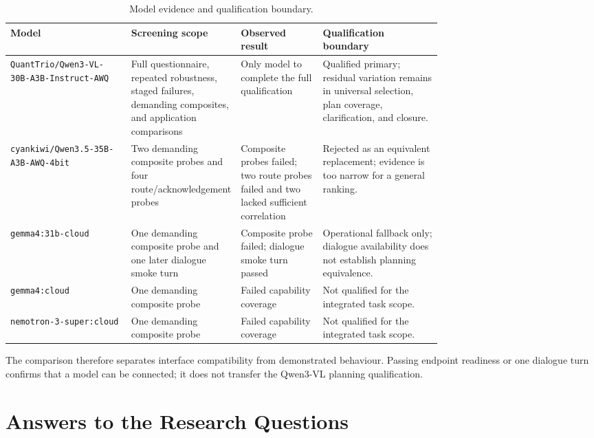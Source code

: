 \begin{landscape}
\begin{table}[H]
\centering
\footnotesize
\renewcommand{\arraystretch}{1.12}
\caption{Model evidence and qualification boundary.}
\label{tab:model-evidence-final}
\begin{tabularx}{\linewidth}{@{}>{\RaggedRight\arraybackslash}p{0.29\linewidth}>{\RaggedRight\arraybackslash}p{0.25\linewidth}>{\RaggedRight\arraybackslash}p{0.19\linewidth}>{\RaggedRight\arraybackslash}X@{}}
\toprule
\textbf{Model} & \textbf{Screening scope} & \textbf{Observed result} & \textbf{Qualification boundary}\\
\midrule
\nolinkurl{QuantTrio/Qwen3-VL-30B-A3B-Instruct-AWQ} & Full questionnaire, repeated robustness, staged failures, demanding composites, and application comparisons & Only model to complete the full qualification & Qualified primary; residual variation remains in universal selection, plan coverage, clarification, and closure.\\
\nolinkurl{cyankiwi/Qwen3.5-35B-A3B-AWQ-4bit} & Two demanding composite probes and four route/acknowledgement probes & Composite probes failed; two route probes failed and two lacked sufficient correlation & Rejected as an equivalent replacement; evidence is too narrow for a general ranking.\\
\nolinkurl{gemma4:31b-cloud} & One demanding composite probe and one later dialogue smoke turn & Composite probe failed; dialogue smoke turn passed & Operational fallback only; dialogue availability does not establish planning equivalence.\\
\nolinkurl{gemma4:cloud} & One demanding composite probe & Failed capability coverage & Not qualified for the integrated task scope.\\
\nolinkurl{nemotron-3-super:cloud} & One demanding composite probe & Failed capability coverage & Not qualified for the integrated task scope.\\
\bottomrule
\end{tabularx}
\end{table}
\end{landscape}

The comparison therefore separates interface compatibility from demonstrated behaviour. Passing endpoint readiness or one dialogue turn confirms that a model can be connected; it does not transfer the Qwen3-VL planning qualification.

\section{Answers to the Research Questions}

